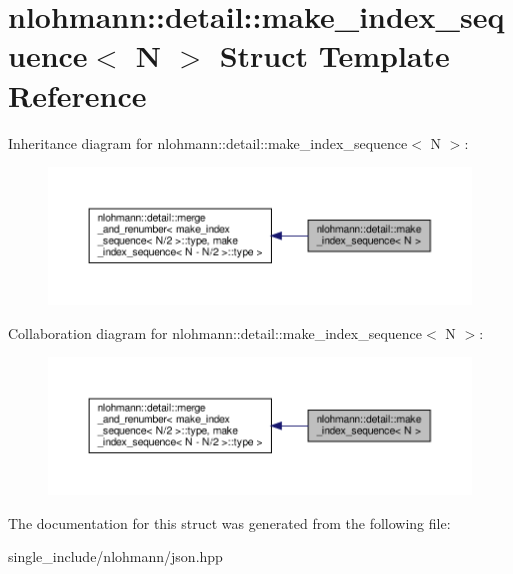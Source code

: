 \hypertarget{structnlohmann_1_1detail_1_1make__index__sequence}{}\section{nlohmann\+:\+:detail\+:\+:make\+\_\+index\+\_\+sequence$<$ N $>$ Struct Template Reference}
\label{structnlohmann_1_1detail_1_1make__index__sequence}


Inheritance diagram for nlohmann\+:\+:detail\+:\+:make\+\_\+index\+\_\+sequence$<$ N $>$\+:\nopagebreak
\begin{figure}[H]
\begin{center}
\leavevmode
\includegraphics[width=350pt]{structnlohmann_1_1detail_1_1make__index__sequence__inherit__graph}
\end{center}
\end{figure}


Collaboration diagram for nlohmann\+:\+:detail\+:\+:make\+\_\+index\+\_\+sequence$<$ N $>$\+:\nopagebreak
\begin{figure}[H]
\begin{center}
\leavevmode
\includegraphics[width=350pt]{structnlohmann_1_1detail_1_1make__index__sequence__coll__graph}
\end{center}
\end{figure}


The documentation for this struct was generated from the following file\+:\begin{DoxyCompactItemize}
\item 
single\+\_\+include/nlohmann/json.\+hpp\end{DoxyCompactItemize}
